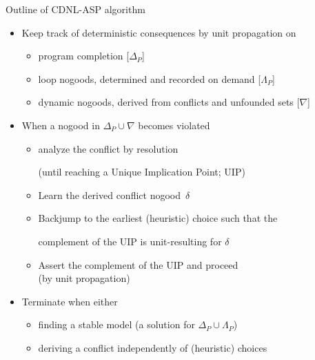 \begin{frame}{Outline of CDNL-ASP algorithm}
  \begin{itemize}
  \item<2-> Keep track of deterministic consequences by unit propagation on
    \begin{itemize}
    \item program completion \hfill [$\Delta_P$]%
    \item loop nogoods, determined and recorded on demand \hfill [$\Lambda_P$]%
    \item dynamic nogoods, derived from conflicts and unfounded sets \hfill[$\nabla$]%
    \end{itemize}
  \item<3-> When a nogood in $\Delta_P\cup\nabla$ becomes \alert<2>{violated}
    \begin{itemize}
    \item \alert<2>{analyze} the conflict by resolution
      \par
      (until reaching a {Unique Implication Point};  UIP)
    \item \alert<2>{Learn} the derived conflict nogood~$\delta$
    \item \alert<2>{Backjump} to the earliest (heuristic) choice such that
      the\par complement of the UIP is unit-resulting for $\delta$
    \item \alert<2>{Assert} the complement of the UIP and proceed\\
      (by unit propagation)
    \end{itemize}
  \item<2-> Terminate when either
    \begin{itemize}
    \item finding a stable model (a solution for $\Delta_P\cup\Lambda_P$)
    \item deriving a conflict independently of (heuristic) choices
    \end{itemize}
  \end{itemize}
\end{frame}
\begin{frame}[shrink=20]%

\end{frame}
